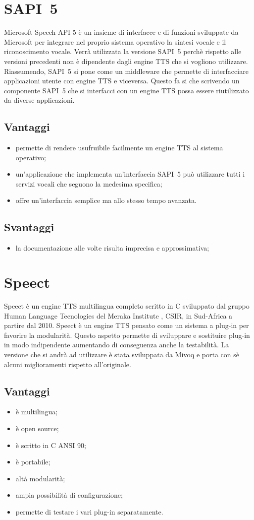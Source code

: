 \section{SAPI~5}
Microsoft Speech API 5 è un insieme di interfacce e di funzioni sviluppate da Microsoft per integrare nel proprio sistema operativo la sintesi vocale e il riconoscimento vocale. Verrà utilizzata la versione SAPI~5 perchè rispetto alle versioni precedenti non è dipendente dagli engine TTS che si vogliono utilizzare. Riassumendo, SAPI~5 si pone come un middleware che permette di interfacciare applicazioni utente con engine TTS e viceversa. Questo fa si che scrivendo un componente SAPI~5 che si interfacci con un engine TTS possa essere riutilizzato da diverse applicazioni.
\subsection*{Vantaggi}
\begin{itemize}
	\item permette di rendere usufruibile facilmente un engine TTS al sistema operativo;
	\item un'applicazione che implementa un'interfaccia SAPI~5 può utilizzare tutti i servizi vocali che seguono la medesima specifica;
	\item offre un'interfaccia semplice ma allo stesso tempo avanzata.
\end{itemize}
\subsection*{Svantaggi}
\begin{itemize}
	\item la documentazione alle volte risulta imprecisa e approssimativa;
\end{itemize}
\section{Speect}
Speect è un engine TTS multilingua completo scritto in C sviluppato dal gruppo Human Language Tecnologies del Meraka Institute , CSIR, in Sud-Africa a partire dal 2010. Speect è un engine TTS pensato come un sistema a plug-in per favorire la modularità. Questo aspetto permette di sviluppare e sostituire plug-in in modo indipendente aumentando di conseguenza anche la testabilità. La versione che si andrà ad utilizzare è stata sviluppata da Mivoq e porta con sè alcuni miglioramenti rispetto all'originale.
\subsection*{Vantaggi}
\begin{itemize}
	\item è multilingua;
	\item è open source;
	\item è scritto in C ANSI 90;
	\item è portabile;
	\item altà modularità;
	\item ampia possibilità di configurazione;
	\item permette di testare i vari plug-in separatamente.
\end{itemize}
